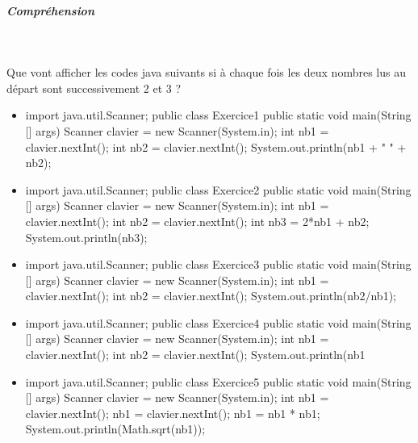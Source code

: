 \documentclass[11pt,a4paper]{article}
\begin{document}
			
		\subparagraph{Compr\'ehension} 
		
                \textcolor{white}{.} \par
            
							  Que vont afficher les codes java suivants si \`a chaque fois les deux nombres lus au d\'epart sont successivement 2 et 3 ?
							
					\begin{itemize}
				
			\item \begin{Java}
import java.util.Scanner;
public class Exercice1 {
    public static void main(String [] args) {
        Scanner clavier = new Scanner(System.in);
        int nb1 = clavier.nextInt();
        int nb2 = clavier.nextInt();
        System.out.println(nb1 + " " + nb2);
    }
}
        \end{Java} \textcolor{gray}{\underline{\hspace*{2em}}} 
			\item \begin{Java}
import java.util.Scanner;
public class Exercice2 {
    public static void main(String [] args) {
        Scanner clavier = new Scanner(System.in);
        int nb1 = clavier.nextInt();
        int nb2 = clavier.nextInt();
        int nb3 = 2*nb1 + nb2;
        System.out.println(nb3);
    }
}
									\end{Java} \textcolor{gray}{\underline{\hspace*{1em}}} 
			\item \begin{Java}
import java.util.Scanner;
public class Exercice3 {
    public static void main(String [] args) {
        Scanner clavier = new Scanner(System.in);
        int nb1 = clavier.nextInt();
        int nb2 = clavier.nextInt();
        System.out.println(nb2/nb1);
    }
}
        \end{Java} \textcolor{gray}{\underline{\hspace*{1em}}} 
			\item \begin{Java}
import java.util.Scanner;
public class Exercice4 {
    public static void main(String [] args) {
        Scanner clavier = new Scanner(System.in);
        int nb1 = clavier.nextInt();
        int nb2 = clavier.nextInt();
        System.out.println(nb1%
    }
}
        \end{Java} \textcolor{gray}{\underline{\hspace*{1em}}} 
			\item \begin{Java}
import java.util.Scanner;
public class Exercice5 {
    public static void main(String [] args) {
        Scanner clavier = new Scanner(System.in);
        int nb1 = clavier.nextInt();
        nb1 = clavier.nextInt();
        nb1 = nb1 * nb1;
        System.out.println(Math.sqrt(nb1));
    }
}
        \end{Java} \textcolor{gray}{\underline{\hspace*{1em}}} 
					\end{itemize}
\end{document}
